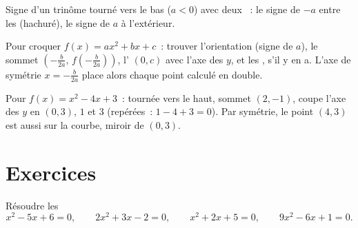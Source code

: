 \begin{omfigure}

{\small Signe d'un trinôme tourné vers le bas ($a < 0$) avec deux
~: le signe de $-a$ entre les  (hachuré), le signe de $a$
à l'extérieur.}
\end{omfigure}

\begin{method}\label{met:g11:quad:reading}
Pour croquer $f(x) = ax^2+bx+c$~: trouver l'orientation (signe de $a$), le
sommet $\left(-\frac{b}{2a},\, f\!\left(-\frac{b}{2a}\right)\right)$,
l' $(0, c)$ avec l'axe des $y$, et les , s'il y en a.
L'axe de symétrie $x = -\frac{b}{2a}$ place alors chaque point calculé en
double.
\end{method}

\begin{example}
Pour $f(x) = x^2 - 4x + 3$~: tournée vers le haut, sommet $(2, -1)$,
coupe l'axe des $y$ en $(0,3)$,  $1$ et $3$ (repérées~:
$1 - 4 + 3 = 0$). Par symétrie, le point $(4, 3)$ est aussi sur la
courbe, miroir de $(0, 3)$.
\end{example}

\section{Exercices}

\begin{exercise}[$\star$]\label{exo:g11:quad:1}
Résoudre les 
\[
x^2 - 5x + 6 = 0, \qquad
2x^2 + 3x - 2 = 0, \qquad
x^2 + 2x + 5 = 0, \qquad
9x^2 - 6x + 1 = 0 .
\]
\end{exercise}

